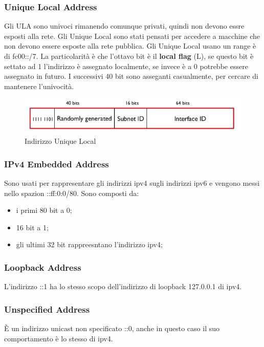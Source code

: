 \documentclass[12pt]{article}
\begin{document}
\subsubsection{Unique Local Address}
Gli ULA sono univoci rimanendo comunque privati, quindi non devono essre esposti alla rete. Gli Unique Local sono stati pensati per accedere a macchine che non devono essere esposte alla rete pubblica. Gli Unique Local  usano un range \`e di fc00::/7. La particolarit\`a \`e che l'ottavo bit \`e il \textbf{local flag} (L), se questo bit \`e settato ad 1 l'indirizzo \`e assegnato localmente, se invece \`e a 0 potrebbe essere assegnato in futuro. I successivi 40 bit sono asseganti casualmente, per cercare di mantenere l'univocit\`a.
\begin{figure}[H]
    \centering
    \includegraphics[width=1\textwidth]{indirizzo-unique-local.png}
    \caption{Indirizzo Unique Local}
    \label{fig:indirizzo-unique-local}
\end{figure}

\subsubsection{IPv4 Embedded Address}
Sono usati per rappresentare gli indirizzi ipv4 sugli indirizzi ipv6 e vengono messi nello spazion ::ff:0:0/80. Sono composti da:
\begin{itemize}
    \item i primi 80 bit a 0;
    \item 16 bit a 1;
    \item gli ultimi 32 bit rappreesntano l'indirizzo ipv4;
\end{itemize}

\subsubsection{Loopback Address}
L'indirizzo ::1 ha lo stesso scopo dell'indirizzo di loopback 127.0.0.1 di ipv4.

\subsubsection{Unspecified Address}
\`E un indirizzo unicast non specificato ::0, anche in questo caso il suo comportamento \`e lo stesso di ipv4.
\end{document}
